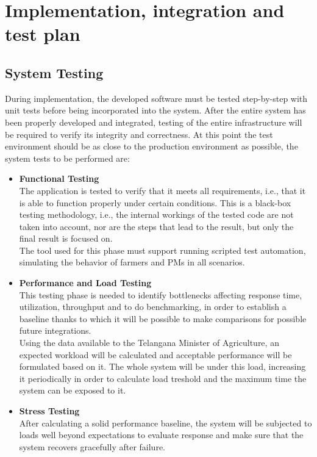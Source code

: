 \documentclass[10pt]{article} %
\begin{document}
\section{Implementation, integration and test plan}
\subsection{System Testing}
During implementation, the developed software must be tested step-by-step with unit tests before 
being incorporated into the system. After the entire system has been properly developed and integrated, 
testing of the entire infrastructure will be required to verify its integrity and correctness. 
At this point the test environment should be as close to the production environment as possible, 
the system tests to be performed are:
\begin{itemize}
    \item \textbf{Functional Testing}\\The application is tested to verify that it meets all 
    requirements, i.e., that it is able to function properly under certain conditions. 
    This is a black-box testing methodology, i.e., the internal workings of the tested code 
    are not taken into account, nor are the steps that lead to the result, but only the final result is focused on.\\
    The tool used for this phase must support running scripted test automation, simulating the 
    behavior of farmers and PMs in all scenarios. %
    \item \textbf{Performance and Load Testing}\\This testing phase is needed to identify bottlenecks affecting response time, utilization,
    throughput and to do benchmarking, in order to establish a baseline thanks to which it will be 
    possible to make comparisons for possible future integrations.\\
    Using the data available to the Telangana Minister of Agriculture, an expected workload will be calculated 
    and acceptable performance will be formulated based on it. The whole system will be under this load, increasing it 
    periodically in order to calculate load treshold and the maximum time the system can be exposed to it. %
    \item \textbf{Stress Testing}\\After calculating a solid performance baseline, the system will be subjected to 
    loads well beyond expectations to evaluate response and make sure that the system recovers gracefully after failure.
\end{itemize}
\end{document}
